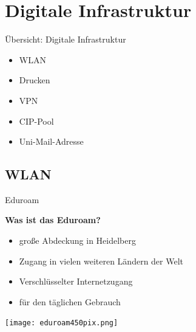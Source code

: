 
\section{Digitale Infrastruktur}
\begin{frame}{Übersicht: Digitale Infrastruktur}
    \large
    \begin{itemize}
        \item{WLAN}
        \item{Drucken}
        \item{VPN}
        \item{CIP-Pool}
        \item{Uni-Mail-Adresse}
    \end{itemize}
\end{frame}


\subsection{WLAN}
\begin{frame}{Eduroam}
    \begin{minipage}[t]{0.715\textwidth}
        \vspace{-2em}
        \large \textbf{Was ist das Eduroam?}
        \normalsize
        \begin{itemize}
            \item<1-> große Abdeckung in Heidelberg
            \item<2-> Zugang in vielen weiteren Ländern der Welt
            \item<3-> Verschlüsselter Internetzugang
            \item<4-> für den täglichen Gebrauch
        \end{itemize}
    \end{minipage}
    \begin{minipage}[t]{0.25\textwidth}
        \begin{flushright}
            \texttt{[image: eduroam450pix.png]}
        \end{flushright}
    \end{minipage}
\end{frame}

